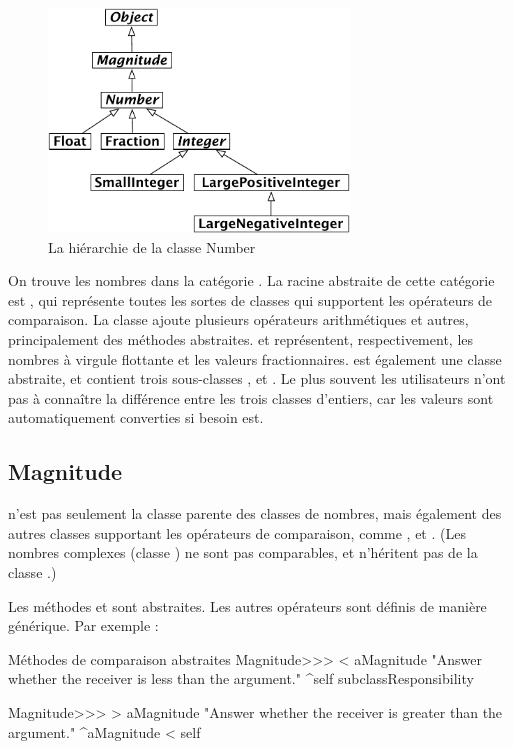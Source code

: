 \documentclass[a4paper,10pt,twoside]{book}
\begin{document}
\begin{figure}[ht]
\centerline {\includegraphics[width=8cm]{NumberHierarchy}}
\caption{La hiérarchie de la classe Number \label{fig:numbers}}
\end{figure}

On trouve les nombres dans la catégorie . La racine abstraite de cette catégorie est , qui représente toutes les sortes de classes qui supportent les opérateurs de comparaison. La classe  ajoute plusieurs opérateurs arithmétiques et autres, principalement des méthodes abstraites.  et  représentent, respectivement, les nombres à virgule flottante et les valeurs fractionnaires.   est également une classe abstraite, et contient trois sous-classes ,  et . Le plus souvent les utilisateurs n'ont pas à connaître la différence entre les trois classes d'entiers, car les valeurs sont automatiquement converties si besoin est.

\subsection{Magnitude}

 n'est pas seulement la classe parente des classes de nombres, mais également des autres classes supportant les opérateurs de comparaison, comme ,  et .  (Les nombres complexes (classe ) ne sont pas comparables, et n'héritent pas de la classe .)

Les méthodes  et  sont abstraites. Les autres opérateurs sont définis de manière générique. Par exemple :

\begin{method}{Méthodes de comparaison abstraites}
Magnitude>>> < aMagnitude 
    "Answer whether the receiver is less than the argument."
    ^self subclassResponsibility

Magnitude>>> > aMagnitude 
    "Answer whether the receiver is greater than the argument."
    ^aMagnitude < self
\end{method}
\end{document}
